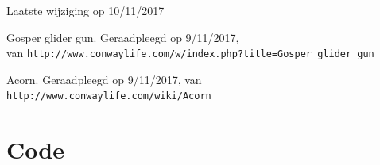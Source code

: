 \documentclass[10pt]{article}
\begin{document}
Laatste wijziging op 10/11/2017

\begin{thebibliography}{9}
     Gosper glider gun. Geraadpleegd op 9/11/2017, \\
van \verb+http://www.conwaylife.com/w/index.php?title=Gosper_glider_gun+

	 Acorn. Geraadpleegd op 9/11/2017, 
van \verb+http://www.conwaylife.com/wiki/Acorn+
\end{thebibliography}

\section{Code}


\end{document}
